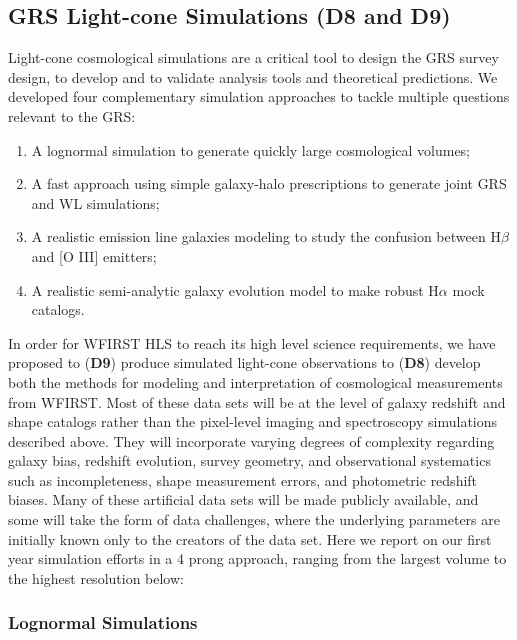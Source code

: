 \subsection{GRS Light-cone Simulations (D8 and D9)}

 \begin{summaryii}
Light-cone cosmological simulations are a critical tool to design the GRS survey design, to develop and to validate analysis tools and theoretical predictions. We developed four complementary simulation approaches to tackle multiple questions relevant to the GRS:
\begin{enumerate}
  \item A lognormal simulation to generate quickly large cosmological volumes;
  \item A fast approach using simple galaxy-halo prescriptions to generate joint GRS and WL simulations;
  \item A realistic emission line galaxies modeling to study the confusion between H$\beta$ and [O III] emitters;
  \item A realistic semi-analytic galaxy evolution model to make robust H$\alpha$ mock catalogs.
 \end{enumerate}
 \end{summaryii}

 In order for WFIRST HLS to reach its  high level science requirements, we have
 proposed to ({\bf D9})  produce simulated light-cone observations to ({\bf D8})
 develop both the methods for modeling and interpretation of cosmological
 measurements from WFIRST.  Most of these data sets will be at the level of
 galaxy redshift and shape catalogs rather than the pixel-level imaging and
 spectroscopy simulations described above. They will incorporate varying degrees
 of complexity regarding galaxy bias, redshift evolution, survey geometry, and
 observational systematics such as incompleteness, shape measurement errors, and
 photometric redshift biases. Many of these artificial data sets will be made
 publicly available, and some will take the form of data challenges, where the
 underlying parameters are initially known only to the creators of the data set.
 Here we report on our first year simulation efforts  in a 4 prong approach,
 ranging from the largest volume to the highest resolution below:

\subsubsection{Lognormal Simulations}

